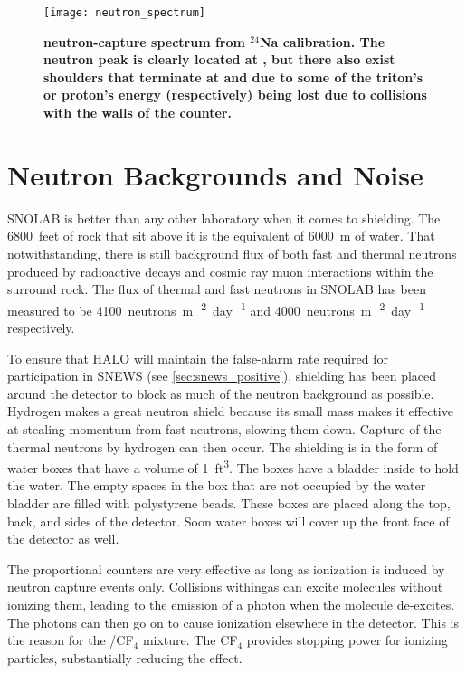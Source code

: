 	\begin{figure}[H]
		\centering
		\texttt{[image: neutron\_spectrum]}
		\caption[Example Neutron-Capture Spectrum]{\bf \he neutron-capture spectrum from $^{24}$Na calibration\rm \cite{Search2011}. The neutron peak is clearly located at , but there also exist shoulders that terminate at  and  due to some of the triton's or proton's energy (respectively) being lost due to collisions with the walls of the counter.}
		\label{fig:neutron_spectrum}
	\end{figure}


	\section{Neutron Backgrounds and Noise}
	\label{sec:noise}
	SNOLAB is better than any other laboratory when it comes to shielding. The \SI[mode=text]{6800}{feet} of rock that sit above it is the equivalent of \SI{6000}{\meter} of water. That notwithstanding, there is still background flux of both fast and thermal neutrons produced by radioactive decays and cosmic ray muon interactions within the surround rock. The flux of thermal and fast neutrons in SNOLAB has been measured to be \SI[mode=text]{4100}{neutrons.m^{-2}.day^{-1}} and \SI[mode=text]{4000}{neutrons.m^{-2}.day^{-1}} respectively\cite{handbook}. 

	To ensure that HALO will maintain the false-alarm rate required for participation in SNEWS (see \SEC \ref{sec:snews_positive}), shielding has been placed around the detector to block as much of the neutron background as possible. Hydrogen makes a great neutron shield because its small mass makes it effective at stealing momentum from fast neutrons, slowing them down. Capture of the thermal neutrons by hydrogen can then occur. The shielding is in the form of water boxes that have a volume of \SI[mode=text]{1}{ft^3}. The boxes have a bladder inside to hold the water. The empty spaces in the box that are not occupied by the water bladder are filled with polystyrene beads. These boxes are placed along the top, back, and sides of the detector. Soon water boxes will cover up the front face of the detector as well.
 
	The proportional counters are very effective as long as ionization is induced by neutron capture events only. Collisions within\he gas can excite molecules without ionizing them, leading to the emission of a photon when the molecule de-excites. The photons can then go on to cause ionization elsewhere in the detector. This is the reason for the \he/CF$_4$ mixture. The CF$_4$ provides stopping power for ionizing particles, substantially reducing the effect.

